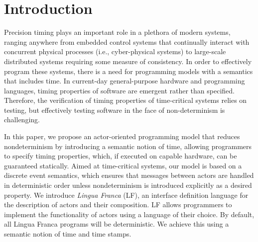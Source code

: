 \documentclass[sigconf]{acmart}
\begin{document}



\maketitle 

\section{Introduction}\label{sec:intro}
Precision timing plays an important role in a plethora of modern systems, ranging anywhere from embedded control systems that continually interact with concurrent physical processes (i.e., cyber-physical systems) to large-scale distributed systems requiring some measure of consistency.
In order to effectively program these systems, there is a need for programming models with a semantics that includes time.
In current-day general-purpose hardware and programming languages, timing properties of software are emergent rather than specified.
Therefore, the verification of timing properties of time-critical systems relies on testing, but effectively testing software in the face of non-determinism is challenging.

In this paper, we propose an actor-oriented programming model that reduces nondeterminism by introducing a semantic notion of time, allowing programmers to specify timing properties, which, if executed on capable hardware, can be guaranteed statically.
Aimed at time-critical systems, our model is based on a discrete event semantics, which ensures that messages between actors are handled in deterministic order unless nondeterminism is introduced explicitly as a desired property.
We introduce \emph{Lingua Franca} (LF), an interface definition language for the description of actors and their composition.
LF allows programmers to implement the functionality of actors using a language of their choice.
By default, all Lingua Franca programs will be deterministic.
We achieve this using a semantic notion of time and time stamps.


\end{document}
